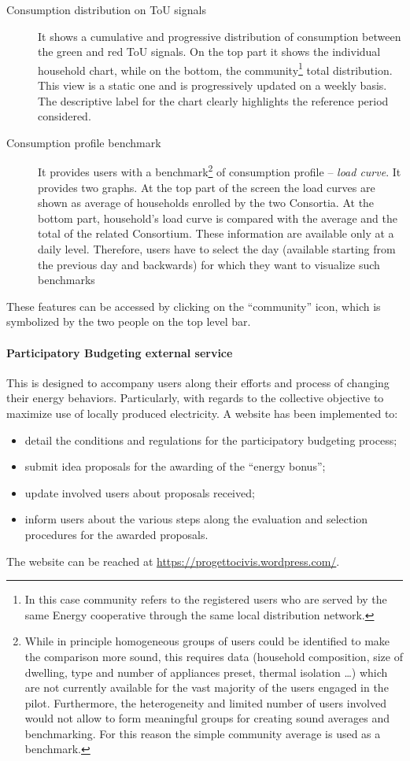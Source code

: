 \begin{description}
 \item[Consumption distribution on ToU signals] It shows a cumulative and progressive distribution of consumption between the green and red ToU signals.
 On the top part it shows the individual household chart, while on the bottom, the community\footnote{In this case community refers to the registered users who 
 are served by the same Energy cooperative through the same local distribution network.} total distribution. This view is a static one and is progressively updated on a weekly basis. The descriptive label for the chart clearly highlights the reference period considered.
 \item[Consumption profile benchmark] It provides users with a benchmark\footnote{While in principle homogeneous groups of users could be identified to make the comparison more sound, this requires data (household composition, size of dwelling, type and number of appliances preset, thermal isolation \ldots) which are not currently available for the vast majority of the users engaged in the pilot.
 Furthermore, the heterogeneity and limited number of users involved would not allow to form meaningful groups for creating sound averages and benchmarking. For this reason the simple community average is used as a benchmark.} of consumption profile -- \textit{load curve}. It provides two graphs. At the top part of the screen the load curves are shown as average of households enrolled by the two Consortia.
 At the bottom part, household's load curve is compared with the average and the total of the related Consortium. These information are available only at a daily level. Therefore, users have to select the day (available starting from the previous day and backwards) for which they want to visualize such benchmarks
\end{description}
These features can be accessed by clicking on the ``community'' icon, which is symbolized by the two people on the top level bar.


\paragraph{Participatory Budgeting external service} 

This is designed to accompany users along their efforts and process of changing their energy behaviors.
Particularly, with regards to the collective objective to maximize use of locally produced electricity. A website has been implemented to:
\begin{itemize}
 \item detail the conditions and regulations for the participatory budgeting process;
 \item submit idea proposals for the awarding of the ``energy bonus'';
 \item update involved users about proposals received;
 \item inform users about the various steps along the evaluation and selection procedures for the awarded proposals. 
\end{itemize}
The website can be reached at \url{https://progettocivis.wordpress.com/}.

%